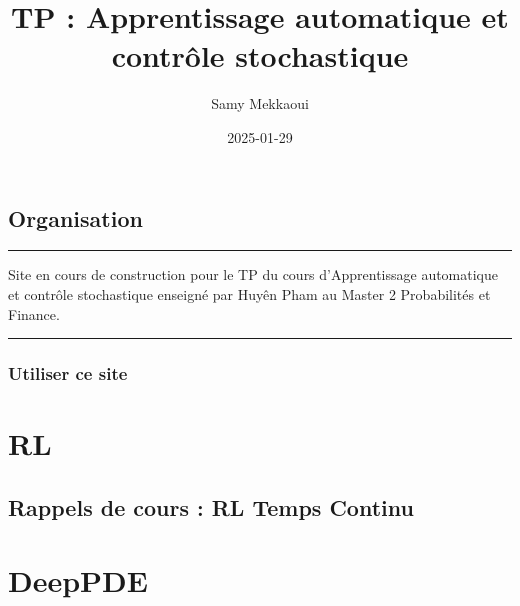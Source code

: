 \documentclass[
  10,
  letterpaper,
  DIV=11,
  numbers=noendperiod]{scrreport}
\title{TP : Apprentissage automatique et contrôle stochastique}
\author{Samy Mekkaoui}
\date{2025-01-29}
\renewcommand*\contentsname{Table des matières}
\newcommand\contentsname{Table des matières}
\theoremstyle{definition}
\theoremstyle{remark}
\begin{document}
\maketitle

\renewcommand*\contentsname{Table des matières}
{
\hypersetup{linkcolor=}
\setcounter{tocdepth}{2}
\tableofcontents
}


\chapter*{Organisation}\label{organisation}


\begin{center}\rule{0.5\linewidth}{0.5pt}\end{center}

Site en cours de construction pour le TP du cours d'Apprentissage
automatique et contrôle stochastique enseigné par Huyên Pham au Master 2
Probabilités et Finance.

\begin{center}\rule{0.5\linewidth}{0.5pt}\end{center}

\section*{Utiliser ce site}\label{utiliser-ce-site}


\part{RL}

\chapter{Rappels de cours : RL Temps
Continu}\label{rappels-de-cours-rl-temps-continu}

\chapter{}\label{section}

\part{DeepPDE}
\end{document}
